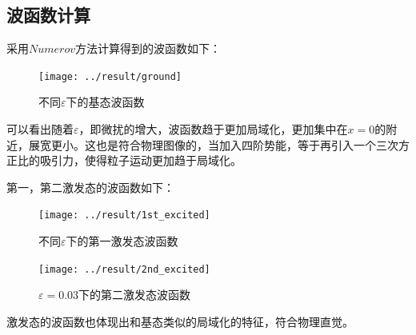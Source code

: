 \documentclass[UTF8]{ctexart}
\begin{document}
	
	\subsection{波函数计算}
	
	\begin{flushleft}
		采用$Numerov$方法计算得到的波函数如下：
		
			\begin{figure}[H]
				\centering\texttt{[image: ../result/ground]}
				\caption{不同$\varepsilon$下的基态波函数}
			\end{figure}
		
	可以看出随着$\varepsilon$，即微扰的增大，波函数趋于更加局域化，更加集中在$x=0$的附近，展宽更小。这也是符合物理图像的，当加入四阶势能，等于再引入一个三次方正比的吸引力，使得粒子运动更加趋于局域化。
	
	第一，第二激发态的波函数如下：
	
		\begin{figure}[H]
		\centering\texttt{[image: ../result/1st\_excited]}
		\caption{不同$\varepsilon$下的第一激发态波函数}
	\end{figure}	
	
		\begin{figure}[H]
		\centering\texttt{[image: ../result/2nd\_excited]}
		\caption{$\varepsilon=0.03$下的第二激发态波函数}
	\end{figure}	
		
	激发态的波函数也体现出和基态类似的局域化的特征，符合物理直觉。	
		
	\end{flushleft}
	
	
	
	

%		
\end{document}
